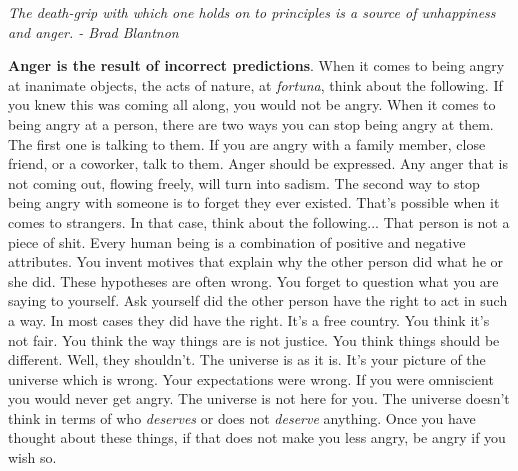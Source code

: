 \documentclass[a4paper,hidelinks]{article}
\begin{document}
\newpage

\begin{center}
\textit{The death-grip with which one holds on to principles is a source of unhappiness and anger. - Brad Blantnon}
\end{center}

\textbf{Anger is the result of incorrect predictions}.
When it comes to being angry at inanimate objects, the acts of nature, at \textit{fortuna}, think about the following.
If you knew this was coming all along, you would not be angry.
When it comes to being angry at a person, there are two ways you can stop being angry at them.
The first one is talking to them.
If you are angry with a family member, close friend, or a coworker, talk to them.
Anger should be expressed.
Any anger that is not coming out, flowing freely, will turn into sadism.
The second way to stop being angry with someone is to forget they ever existed.
That's possible when it comes to strangers.
In that case, think about the following...
That person is not a piece of shit.
Every human being is a combination of positive and negative attributes.
You invent motives that explain why the other person did what he or she did.
These hypotheses are often wrong.
You forget to question what you are saying to yourself.
Ask yourself did the other person have the right to act in such a way.
In most cases they did have the right.
It's a free country.
You think it's not fair.
You think the way things are is not justice.
You think things should be different.
Well, they shouldn't.
The universe is as it is.
It's your picture of the universe which is wrong.
Your expectations were wrong.
If you were omniscient you would never get angry.
The universe is not here for you.
The universe doesn't think in terms of who \textit{deserves} or does not \textit{deserve} anything.
Once you have thought about these things, if that does not make you less angry, be angry if you wish so.

\newpage
\end{document}
